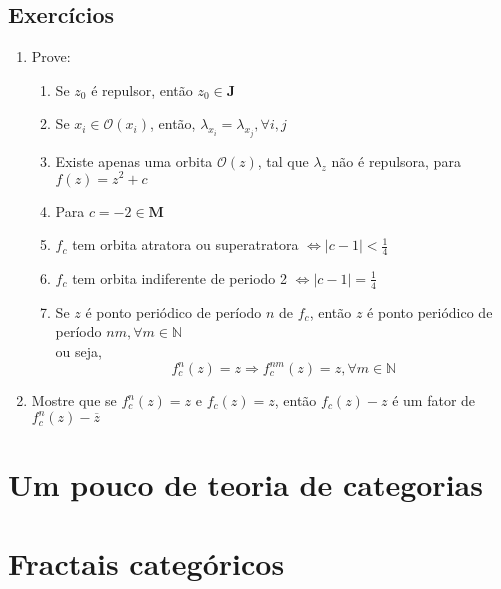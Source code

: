 \documentclass[12pt]{report}
\theoremstyle{definition}
\begin{document}
\section{Exercícios}

\begin{enumerate}
    \item Prove:
        \begin{enumerate}
            \item 
                Se \(z_0\) é repulsor, então \(z_0 \in \mathbf{J}\)
            \item
                Se \(x_i \in \mathcal{O}(x_i)\), então, \(\lambda_{x_i} = \lambda_{x_j}, \forall i,j\)
            \item
                Existe apenas uma orbita \( \mathcal{O}(z)\), tal que \(\lambda_{z}\) não é repulsora, para \(f(z) = z^2 + c \)
            \item 
                Para \( c = -2 \in \mathbf{M} \)
            \item 
                \(f_c \) tem orbita atratora ou superatratora \( \Longleftrightarrow |c-1| < \frac{1}{4}\)
            \item
                \(f_c \) tem orbita indiferente de periodo 2 \( \Longleftrightarrow |c-1| = \frac{1}{4}\)
            \item
                Se \(z\) é ponto periódico de período \(n\) de \(f_c\), então \(z\) é ponto periódico de período \(nm, \forall m \in \mathbb{N} \)
                \\
                ou seja,
                \\
                \[ 
                    f_c^n(z) = z \Longrightarrow f_c^{nm}(z) = z, \forall m \in \mathbb{N} 
                \]
        \end{enumerate}
    \item
        Mostre que se \( f_c^n(z) = z \) e \(f_c(z) = z \), então 
        \(f_c(z) - z \) é um fator de \( f_c^n(z) - \overline{z} \)
        
        
\end{enumerate}



\chapter{Um pouco de teoria de categorias}

\chapter{Fractais categóricos}



\begin{appendix}
  \listoffigures
  \listoftables
\end{appendix}
\end{document}
